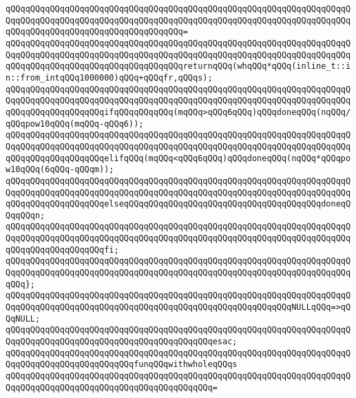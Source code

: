 \verb|qQQqqQQqqQQqqQQqqQQqqQQqqQQqqQQqqQQqqQQqqQQqqQQqqQQqqQQqqQQqqQQqqQQqqQQqqQQqqQQqqQQqqQQqqQQqqQQqqQQqqQQqqQQqqQQqqQQqqQQqqQQqqQQqqQQqqQQqqQQqqQQqqQQqqQQqqQQqqQQqqQQqqQQqqQQqqQQq=|\newline
\verb|qQQqqQQqqQQqqQQqqQQqqQQqqQQqqQQqqQQqqQQqqQQqqQQqqQQqqQQqqQQqqQQqqQQqqQQqqQQqqQQqqQQqqQQqqQQqqQQqqQQqqQQqqQQqqQQqqQQqqQQqqQQqqQQqqQQqqQQqqQQqqQQqqQQqqQQqqQQqqQQqqQQqqQQqqQQqqQQqreturnqQQq(whqQQq*qQQq(inline_t::in::from_intqQQq1000000)qQQq+qQQqfr,qQQqs);|\newline
\newline
\verb|qQQqqQQqqQQqqQQqqQQqqQQqqQQqqQQqqQQqqQQqqQQqqQQqqQQqqQQqqQQqqQQqqQQqqQQqqQQqqQQqqQQqqQQqqQQqqQQqqQQqqQQqqQQqqQQqqQQqqQQqqQQqqQQqqQQqqQQqqQQqqQQqqQQqqQQqqQQqqQQqifqQQqqQQqqQQq(mqQQq>qQQq6qQQq)qQQqdoneqQQq(nqQQq/qQQqpow10qQQq(mqQQq-qQQq6));|\newline
\verb|qQQqqQQqqQQqqQQqqQQqqQQqqQQqqQQqqQQqqQQqqQQqqQQqqQQqqQQqqQQqqQQqqQQqqQQqqQQqqQQqqQQqqQQqqQQqqQQqqQQqqQQqqQQqqQQqqQQqqQQqqQQqqQQqqQQqqQQqqQQqqQQqqQQqqQQqqQQqqQQqelifqQQq(mqQQq<qQQq6qQQq)qQQqdoneqQQq(nqQQq*qQQqpow10qQQq(6qQQq-qQQqm));|\newline
\verb|qQQqqQQqqQQqqQQqqQQqqQQqqQQqqQQqqQQqqQQqqQQqqQQqqQQqqQQqqQQqqQQqqQQqqQQqqQQqqQQqqQQqqQQqqQQqqQQqqQQqqQQqqQQqqQQqqQQqqQQqqQQqqQQqqQQqqQQqqQQqqQQqqQQqqQQqqQQqqQQqelseqQQqqQQqqQQqqQQqqQQqqQQqqQQqqQQqqQQqqQQqdoneqQQqqQQqn;|\newline
\verb|qQQqqQQqqQQqqQQqqQQqqQQqqQQqqQQqqQQqqQQqqQQqqQQqqQQqqQQqqQQqqQQqqQQqqQQqqQQqqQQqqQQqqQQqqQQqqQQqqQQqqQQqqQQqqQQqqQQqqQQqqQQqqQQqqQQqqQQqqQQqqQQqqQQqqQQqqQQqqQQqfi;|\newline
\verb|qQQqqQQqqQQqqQQqqQQqqQQqqQQqqQQqqQQqqQQqqQQqqQQqqQQqqQQqqQQqqQQqqQQqqQQqqQQqqQQqqQQqqQQqqQQqqQQqqQQqqQQqqQQqqQQqqQQqqQQqqQQqqQQqqQQqqQQqqQQqqQQq};|\newline
\newline
\verb|qQQqqQQqqQQqqQQqqQQqqQQqqQQqqQQqqQQqqQQqqQQqqQQqqQQqqQQqqQQqqQQqqQQqqQQqqQQqqQQqqQQqqQQqqQQqqQQqqQQqqQQqqQQqqQQqqQQqqQQqqQQqqQQqNULLqQQq=>qQQqNULL;|\newline
\newline
\verb|qQQqqQQqqQQqqQQqqQQqqQQqqQQqqQQqqQQqqQQqqQQqqQQqqQQqqQQqqQQqqQQqqQQqqQQqqQQqqQQqqQQqqQQqqQQqqQQqqQQqqQQqqQQqqQQqesac;|\newline
\newline
\verb|qQQqqQQqqQQqqQQqqQQqqQQqqQQqqQQqqQQqqQQqqQQqqQQqqQQqqQQqqQQqqQQqqQQqqQQqqQQqqQQqqQQqqQQqqQQqqQQqfunqQQqwithwholeqQQqs|\newline
\verb|qQQqqQQqqQQqqQQqqQQqqQQqqQQqqQQqqQQqqQQqqQQqqQQqqQQqqQQqqQQqqQQqqQQqqQQqqQQqqQQqqQQqqQQqqQQqqQQqqQQqqQQqqQQqqQQq=|\newline
